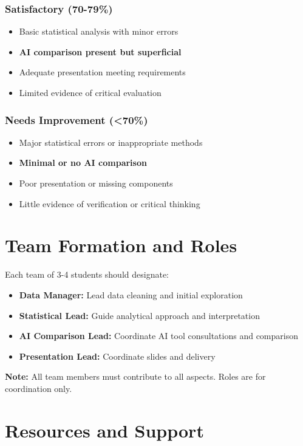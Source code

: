\documentclass[11pt]{article}
\begin{document}
\subsubsection{Satisfactory (70-79\%)}
\begin{itemize}
\item Basic statistical analysis with minor errors
\item \textbf{AI comparison present but superficial}
\item Adequate presentation meeting requirements
\item Limited evidence of critical evaluation
\end{itemize}

\subsubsection{Needs Improvement (<70\%)}
\begin{itemize}
\item Major statistical errors or inappropriate methods
\item \textbf{Minimal or no AI comparison}
\item Poor presentation or missing components
\item Little evidence of verification or critical thinking
\end{itemize}

\section{Team Formation and Roles}

Each team of 3-4 students should designate:
\begin{itemize}
\item \textbf{Data Manager:} Lead data cleaning and initial exploration
\item \textbf{Statistical Lead:} Guide analytical approach and interpretation
\item \textbf{AI Comparison Lead:} Coordinate AI tool consultations and comparison
\item \textbf{Presentation Lead:} Coordinate slides and delivery
\end{itemize}

\textbf{Note:} All team members must contribute to all aspects. Roles are for coordination only.

\section{Resources and Support}
\end{document}
